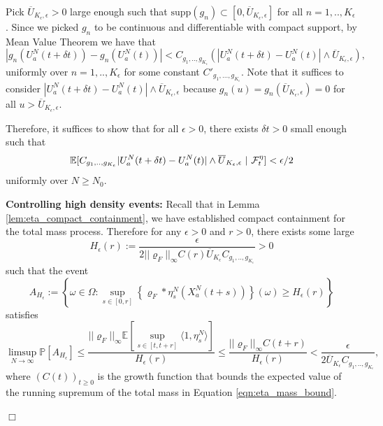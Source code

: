 \documentclass[12pt]{article}
\newenvironment {proof}{{\noindent\bf Proof }}{\hfill $\Box$ \medskip}
\begin{document}
\begin{proof}
Pick $\overline{U}_{K_{\epsilon}, \epsilon}>0$ large enough such that $\text{supp}(g_n)\subset [0,\overline{U}_{K_{\epsilon}, \epsilon}]$ for all $n=1,..,K_{\epsilon}$. Since we picked $g_n$ to be continuous and differentiable with compact support, by Mean Value Theorem we have that 
$$|g_n(U^{N}_{a}(t+\delta t ))-g_n(U^{N}_{a}(t))|<C_{g_1,..,g_{K_{\epsilon}}}(|U^{N}_{a}(t+\delta t)-U^{N}_{a}(t)|\wedge \overline{U}_{K_{\epsilon}, \epsilon}), $$
uniformly over $n=1,..,K_{\epsilon}$ for some constant $C'_{g_1,...,g_{K_{\epsilon}}}$. Note that it suffices to consider $|U^{N}_{a}(t+\delta t)-U^{N}_{a}(t)|\wedge \overline{U}_{K_{\epsilon}, \epsilon}$ because $g_n(u)=g_n(\overline{U}_{K_{\epsilon}, \epsilon})=0$ for all $u > \overline{U}_{K_{\epsilon}, \epsilon}$.

Therefore, it suffices to show that for all $\epsilon > 0$, there exists $\delta t>0$ small enough such that 
\begin{equation}
\mathbb{E}[C_{g_1,..,g_{K_{\epsilon}}}|U^{N}_{a}(t+\delta t)-U^{N}_{a}(t)|\wedge \overline{U}_{K_{\epsilon}, \epsilon} ~|~{\cal F}_t^{
\eta} ] < \epsilon /2    
\end{equation}
uniformly over $N \geq N_0$.

\textbf{Controlling high density events:}
Recall that in Lemma \ref{lem:eta_compact_containment}, we have established compact containment for the total mass process. Therefore for any $\epsilon>0$ and $r>0$, there exists some large 
\begin{equation}
    \label{eq: Mass Bound Constant}
H_{\epsilon}(r):=\frac{\epsilon}{2||\varrho_F||_{\infty}C(r) \overline{U}_{K_{\epsilon}}C_{g_1,..,g_{K_{\epsilon}}}}>0    
\end{equation}
such that 
the event 
$$A_{H_{\epsilon}}:= \left\{ \omega \in \Omega: \sup_{s\in [0,r]}\left\{\varrho_F*\eta^N_s(X^N_a(t+s)) \right\}(\omega) \geq H_{\epsilon}(r) \right\}$$
satisfies
\begin{equation}
\limsup_{N \to \infty}\mathbb{P}\left[A_{H_{\epsilon}}\right]
\leq  \frac{||\varrho_F||_{\infty}\mathbb{E}[\sup_{s\in [t,t+r]}\langle 1,  \eta^N_s \rangle ]}{H_{\epsilon}(r)}
\leq  \frac{||\varrho_F||_{\infty}C(t+r)}{H_{\epsilon}(r)}
< \frac{\epsilon}{2 \overline{U}_{K_{\epsilon}}C_{g_1,..,g_{K_{\epsilon}}}},
\end{equation}
where $(C(t))_{t \geq 0}$ is the growth function that bounds the expected value of the running supremum of the total mass in Equation \eqref{eqn:eta_mass_bound}.


\end{proof}
\end{document}
